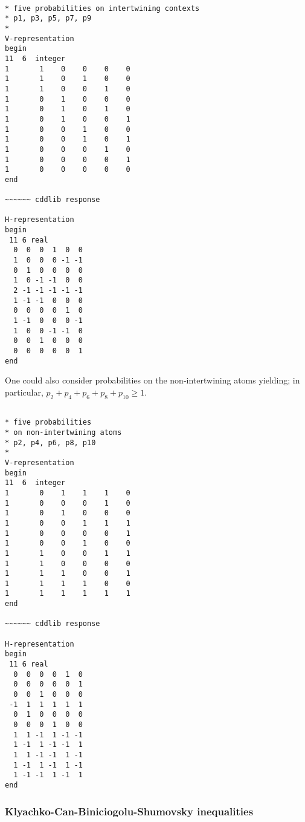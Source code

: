 \documentclass[%
 showpacs,
 showkeys,
 preprintnumbers,
 amsmath,amssymb,
 aps,
  pra,
  longbibliography,
 floatfix,
 ]{revtex4-1}
\begin{document}
{ \begin{lstlisting}[backgroundcolor=\color{yellow!10},framerule=0pt,breaklines=true, frame=tb]

* five probabilities on intertwining contexts
* p1, p3, p5, p7, p9
*
V-representation
begin
11  6  integer
1       1    0    0    0    0
1       1    0    1    0    0
1       1    0    0    1    0
1       0    1    0    0    0
1       0    1    0    1    0
1       0    1    0    0    1
1       0    0    1    0    0
1       0    0    1    0    1
1       0    0    0    1    0
1       0    0    0    0    1
1       0    0    0    0    0
end

~~~~~~ cddlib response

H-representation
begin
 11 6 real
  0  0  0  1  0  0
  1  0  0  0 -1 -1
  0  1  0  0  0  0
  1  0 -1 -1  0  0
  2 -1 -1 -1 -1 -1
  1 -1 -1  0  0  0
  0  0  0  0  1  0
  1 -1  0  0  0 -1
  1  0  0 -1 -1  0
  0  0  1  0  0  0
  0  0  0  0  0  1
end

\end{lstlisting}  }

One could also consider probabilities on the non-intertwining atoms yielding; in particular,
$p_2+p_4+p_6+p_8+p_{10} \ge 1$.

{ \begin{lstlisting}[backgroundcolor=\color{yellow!10},framerule=0pt,breaklines=true, frame=tb]

* five probabilities
* on non-intertwining atoms
* p2, p4, p6, p8, p10
*
V-representation
begin
11  6  integer
1       0    1    1    1    0
1       0    0    0    1    0
1       0    1    0    0    0
1       0    0    1    1    1
1       0    0    0    0    1
1       0    0    1    0    0
1       1    0    0    1    1
1       1    0    0    0    0
1       1    1    0    0    1
1       1    1    1    0    0
1       1    1    1    1    1
end

~~~~~~ cddlib response

H-representation
begin
 11 6 real
  0  0  0  0  1  0
  0  0  0  0  0  1
  0  0  1  0  0  0
 -1  1  1  1  1  1
  0  1  0  0  0  0
  0  0  0  1  0  0
  1  1 -1  1 -1 -1
  1 -1  1 -1 -1  1
  1  1 -1 -1  1 -1
  1 -1  1 -1  1 -1
  1 -1 -1  1 -1  1
end

\end{lstlisting}  }




\subsubsection{Klyachko-Can-Biniciogolu-Shumovsky inequalities}
\label{2017-b-kcbsia}
\end{document}
